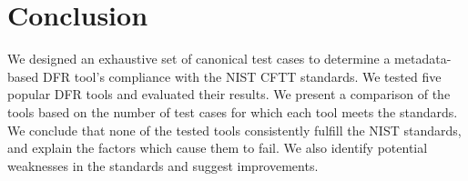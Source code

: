 \section{Conclusion}

We designed an exhaustive set of canonical test cases to determine a metadata-based DFR tool's compliance with the NIST CFTT standards.
We tested five popular DFR tools and evaluated their results.
We present a comparison of the tools based on the number of test cases for which each tool meets the standards.
We conclude that none of the tested tools consistently fulfill the NIST standards, and explain the factors which cause them to fail.
We also identify potential weaknesses in the standards and suggest improvements.


